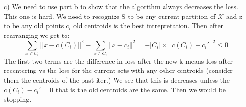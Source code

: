 \documentclass{article}
\begin{document}
c) We need to use part b to show that the algorithm always decreases the loss.
This one is hard. We need to recognize S to be any current partition of $\mathcal{X}$ and z to be any old points $c_i$ old centroids is the best intrepretation. 
Then after rearranging we get to:
$$\sum_{x \in C_i}||x-c(C_i)||^2 - \sum_{x \in C_i}||x - c_i||^2 
= - |C_i|\times||c(C_i) -c_i' ||^2 \leq 0
$$
The first two terms are the difference in loss after the new k-means loss after recentering  
vs the loss for the current sets with any other centroids (consider them the centroids of the past iter.)
We see that this is decreases unless the $c(C_i) -c_i' = 0$ that is the old centroids are the same. Then we would 
be stopping.
\end{document}
